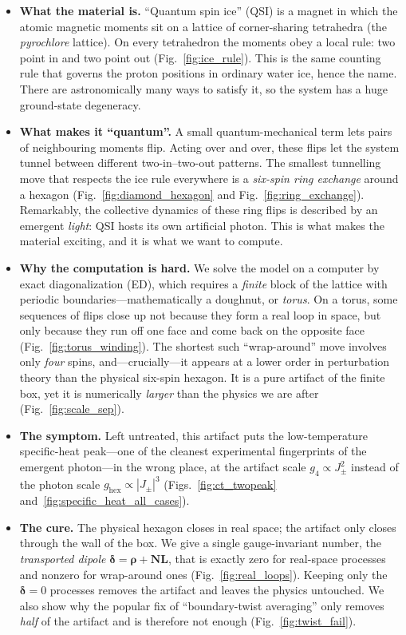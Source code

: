 \documentclass[11pt,letterpaper]{article}
\newcommand{\bN}{\bm N}
\newcommand{\bL}{\bm L}
\newcommand{\brho}{\bm \rho}
\newcommand{\bdelta}{\bm \delta}
\theoremstyle{plain}
\theoremstyle{definition}
\begin{document}
\begin{itemize}
\item \textbf{What the material is.}  ``Quantum spin ice'' (QSI) is a magnet
in which the atomic magnetic moments sit on a lattice of corner-sharing
tetrahedra (the \emph{pyrochlore} lattice).  On every tetrahedron the moments
obey a local rule: two point in and two point out
(Fig.~\ref{fig:ice_rule}).  This is the same counting rule that governs the
proton positions in ordinary water ice, hence the name.  There are
astronomically many ways to satisfy it, so the system has a huge
ground-state degeneracy.

\item \textbf{What makes it ``quantum''.}  A small quantum-mechanical term
lets pairs of neighbouring moments flip.  Acting over and over, these flips
let the system tunnel between different two-in--two-out patterns.  The
smallest tunnelling move that respects the ice rule everywhere is a
\emph{six-spin ring exchange} around a hexagon
(Fig.~\ref{fig:diamond_hexagon} and Fig.~\ref{fig:ring_exchange}).  Remarkably,
the collective dynamics of these ring flips is described by an emergent
\emph{light}: QSI hosts its own artificial photon.  This is what makes the
material exciting, and it is what we want to compute.

\item \textbf{Why the computation is hard.}  We solve the model on a computer
by exact diagonalization (ED), which requires a \emph{finite} block of the
lattice with periodic boundaries---mathematically a doughnut, or
\emph{torus}.  On a torus, some sequences of flips close up not because they
form a real loop in space, but only because they run off one face and come
back on the opposite face (Fig.~\ref{fig:torus_winding}).  The shortest such
``wrap-around'' move involves only \emph{four} spins, and---crucially---it
appears at a lower order in perturbation theory than the physical six-spin
hexagon.  It is a pure artifact of the finite box, yet it is numerically
\emph{larger} than the physics we are after (Fig.~\ref{fig:scale_sep}).

\item \textbf{The symptom.}  Left untreated, this artifact puts the
low-temperature specific-heat peak---one of the cleanest experimental
fingerprints of the emergent photon---in the wrong place, at the artifact
scale $g_4\propto J_\pm^2$ instead of the photon scale
$g_{\mathrm{hex}}\propto|J_\pm|^3$ (Figs.~\ref{fig:ct_twopeak}
and~\ref{fig:specific_heat_all_cases}).

\item \textbf{The cure.}  The physical hexagon closes in real space; the
artifact only closes through the wall of the box.  We give a single
gauge-invariant number, the \emph{transported dipole}
$\bdelta=\brho+\bN\bL$, that is exactly zero for real-space processes and
nonzero for wrap-around ones (Fig.~\ref{fig:real_loops}).  Keeping only the
$\bdelta=0$ processes removes the artifact and leaves the physics untouched.
We also show why the popular fix of ``boundary-twist averaging'' only removes
\emph{half} of the artifact and is therefore not enough
(Fig.~\ref{fig:twist_fail}).
\end{itemize}
\end{document}
